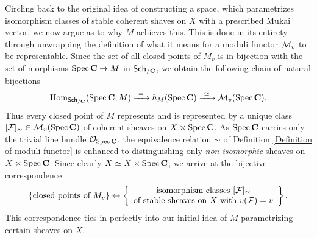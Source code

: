 

Circling back to the original idea of constructing a space, which parametrizes isomorphism classes of stable coherent shaves on $X$ with a prescribed Mukai vector, we now argue as to why $M$ achieves this. This is done in its entirety through unwrapping the definition of what it means for a moduli functor $\mathcal M_v$ to be representable. Since the set of all closed points of $M_v$ is in bijection with the set of morphisms $\operatorname{Spec}\mathbf C \to M$ in $\mathsf{Sch}_{/\mathbf C}$, we obtain the following chain of natural bijections
\begin{equation}
    \label{eq: natural iso applied to SpecC}
    \operatorname{Hom}_{\mathsf{Sch}_{/\mathbf C}}(\operatorname{Spec}\mathbf C, M) \xrightarrow{\ = \ } h_{M}(\operatorname{Spec}\mathbf C) \xrightarrow{\ \simeq \ } \mathcal M_v(\operatorname{Spec}\mathbf C).
\end{equation}
Thus every closed point of $M$ represents and is represented by a unique class $[\mathcal F]_\sim \in \mathcal M_v(\operatorname{Spec}\mathbf C)$ of coherent sheaves on $X \times \operatorname{Spec}\mathbf C$. As $\operatorname{Spec}\mathbf C$ carries only the trivial line bundle ${\mathcal{O}_{\operatorname{Spec}\mathbf C}}$, the equivalence relation $\sim$ of Definition \ref{Definition of moduli functor} is enhanced to distinguishing only \emph{non-isomorphic} sheaves on $X \times \operatorname{Spec}\mathbf C$. Since clearly $X \simeq X \times \operatorname{Spec}\mathbf C$, we arrive at the bijective correspondence
\begin{equation}
    \label{eq: closed points of M}
    \{ \text{closed points of $M_v$}\} 
    \leftrightarrow \left\{
        \begin{array}{c}
            \text{isomorphism classes $[\mathcal F]_\simeq$} \\
            \text{of stable sheaves on $X$ with $v(\mathcal F) = v$}
        \end{array}
        \right\}.
\end{equation}
This correspondence ties in perfectly into our initial idea of $M$ parametrizing certain sheaves on $X$.  

